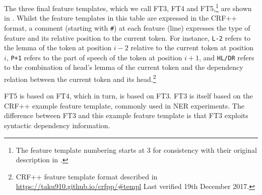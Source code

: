 \documentclass[output=paper,modfonts,nonflat]{langsci/langscibook}
\begin{document}
The three final feature templates, which we call FT3, FT4 and FT5,\footnote{The feature template numbering starts at 3 for consistency with their original description in \cite{maldonado2017}.} are shown in . Whilst the feature templates in this table are expressed in the CRF++ format, a comment (starting with \texttt{\#}) at each feature (line) expresses the type of feature and its relative position to the current token. For instance, \texttt{L-2} refers to the lemma of the token at position $i-2$ relative to the current token at position~$i$, \texttt{P+1} refers to the part of speech of the token at position $i+1$, and \texttt{HL/DR} refers to the combination of head's lemma of the current token and the dependency relation between the current token and its head.\footnote{CRF++ feature template format described in \url{https://taku910.github.io/crfpp/\#templ} Last verified 19th December 2017.}

FT5 is based on FT4, which in turn, is based on FT3. FT3 is itself based on the CRF++ example feature template, commonly used in NER experiments. The difference between FT3 and this example feature template is that FT3 exploits syntactic dependency information. 
\end{document}
